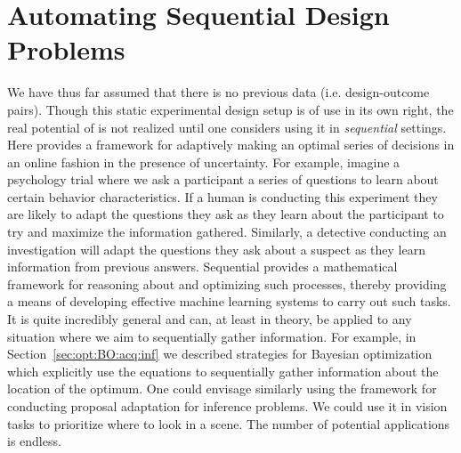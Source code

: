 
\section{Automating Sequential Design Problems}
\label{sec:design:seq}

We have thus far assumed that there is no previous data (i.e. design-outcome pairs).
Though this static experimental design setup is of use in its own right, the real potential
of \Bad is not realized until one considers using it in \emph{sequential} settings.
Here \Bad provides a framework for adaptively making an optimal series of decisions
in an online fashion in the presence of uncertainty.  For example, imagine a psychology
trial where we ask a participant a series of questions to learn about certain behavior
characteristics.  If a human is conducting this experiment they are likely to adapt
the questions they ask as they learn about the participant to try and maximize the information
gathered.  Similarly, a detective conducting an investigation will
adapt the questions they ask about a suspect as they learn information from previous
answers.  Sequential \Bad provides a mathematical framework for reasoning about and optimizing
such processes, thereby providing a means of developing effective machine learning systems to
carry out such tasks.
  It is quite incredibly general and can, at least in theory, be applied to any
situation where we aim to sequentially gather information.  For example, in Section~\ref{sec:opt:BO:acq:inf}
we described strategies for Bayesian optimization which explicitly use the \Bad equations
to sequentially gather information about the location of the optimum.  One could envisage similarly
using the framework for conducting proposal adaptation for inference problems.  We could
use it in vision tasks to prioritize where to look in a scene.  The number of potential
applications is endless.

